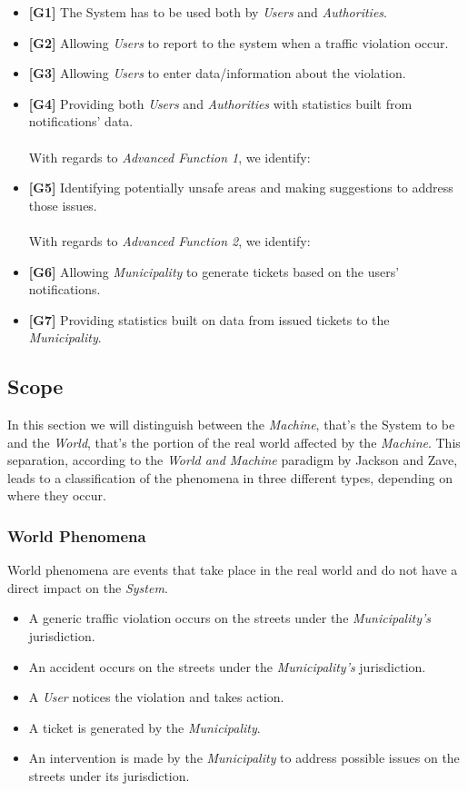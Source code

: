 \documentclass {article}
\begin{document}
		\begin{itemize}
			 \item {\bf [G1]} The System has to be used both by {\it Users} and {\it Authorities}.
   			 \item {\bf [G2]} Allowing {\it Users} to report to the system when a traffic violation occur.		
			 \item {\bf [G3]} Allowing {\it Users} to enter data/information about the violation.
   			 \item {\bf [G4]} Providing both {\it Users} and {\it Authorities} with statistics built from notifications’ data.    			  
   			 \\
			 \\
With regards to {\it {\it Advanced Function 1}}, we identify: 
   			 \item {\bf [G5]} Identifying potentially unsafe areas and making suggestions to address those issues.
   			 \\
			 \\
 With regards to {\it Advanced Function 2}, we identify:
			  \item {\bf [G6]} Allowing {\it Municipality} to generate tickets based on the users’ notifications. 
			  \item {\bf [G7]} Providing statistics built on data from issued tickets to the {\it Municipality}.		
			  \end{itemize}
			
	\subsection{Scope}
	In this section we will distinguish between the {\it Machine}, that's the System to be and the {\it World}, that's the portion of the real world affected by the {\it Machine}. This separation, according to the {\it World and Machine} paradigm by Jackson and Zave, leads to a classification of the phenomena in three different types, depending on where they occur. 		
		\subsubsection{World Phenomena}
		World phenomena are events that take place in the real world and do not have a direct impact on the {\it System}. 
		\begin{itemize}
			\item A generic traffic violation occurs on the streets under the {\it Municipality's} jurisdiction. 
			\item An accident occurs on the streets under the {\it Municipality's} jurisdiction.
			\item A {\it User} notices the violation and takes action.
			\item A ticket is generated by the {\it Municipality}.
			\item An intervention is made by the {\it Municipality} to address possible issues on the streets under its jurisdiction.
		\end{itemize}
\end{document}
